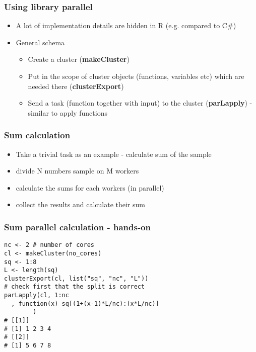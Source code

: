 \documentclass[bigger]{beamer}
\begin{document}
\begin{frame}
\frametitle{Using library parallel}
\label{sec-3-3}
\begin{itemize}

\item A lot of implementation details are hidden in R (e.g. compared to C\#)
\label{sec-3-3-1}%

\item General schema
\label{sec-3-3-2}%
\begin{itemize}

\item Create a cluster (\textbf{makeCluster})
\label{sec-3-3-2-1}%

\item Put in the scope of cluster objects (functions, variables etc) which are needed there (\textbf{clusterExport})
\label{sec-3-3-2-2}%

\item Send a task (function together with input) to the cluster (\textbf{parLapply}) - similar to apply functions
\label{sec-3-3-2-3}%
\end{itemize} %
\end{itemize} %
\end{frame}
\begin{frame}
\frametitle{Sum calculation}
\label{sec-3-4}
\begin{itemize}

\item Take a trivial task as an example - calculate sum of the sample
\label{sec-3-4-1}%

\item divide N numbers sample on M workers
\label{sec-3-4-2}%

\item calculate the sums for each workers (in parallel)
\label{sec-3-4-3}%

\item collect the results and calculate their sum
\label{sec-3-4-4}%
\end{itemize} %
\end{frame}
\begin{frame}[fragile]
\frametitle{Sum parallel calculation - hands-on}
\label{sec-3-5}


\begin{verbatim}
nc <- 2 # number of cores
cl <- makeCluster(no_cores)
sq <- 1:8
L <- length(sq)
clusterExport(cl, list("sq", "nc", "L"))
# check first that the split is correct
parLapply(cl, 1:nc
  , function(x) sq[(1+(x-1)*L/nc):(x*L/nc)]
        )
# [[1]] 
# [1] 1 2 3 4
# [[2]]
# [1] 5 6 7 8
\end{verbatim}
\end{frame}
\end{document}
